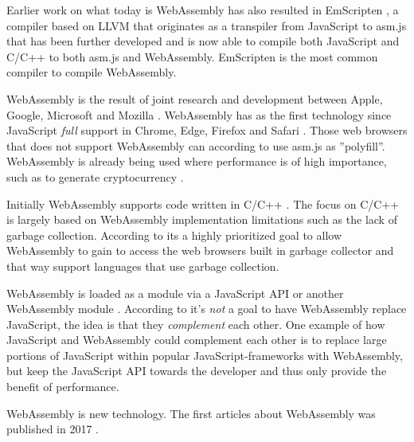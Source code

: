 Earlier work on what today is WebAssembly has also resulted in EmScripten \parencite{Zakai2011}, a compiler based on LLVM \parencite{LattnerAdve2014} that originates as a transpiler from JavaScript to asm.js \parencite{Zakai2011} that has been further developed \parencite{HaasRossbergSchuffTitzerHolmanGohmanWagnerZakaiBastien2017} and is now able to compile both JavaScript and C/C++ to both asm.js and WebAssembly. EmScripten is the most common compiler to compile WebAssembly.

WebAssembly is the result of joint research and development between Apple, Google, Microsoft and Mozilla \parencite{HaasRossbergSchuffTitzerHolmanGohmanWagnerZakaiBastien2017}. WebAssembly has as the first technology since JavaScript \emph{full} support in Chrome, Edge, Firefox and Safari \parencite{Moller2018}. Those web browsers that does not support WebAssembly can according to \textcite{HaasRossbergSchuffTitzerHolmanGohmanWagnerZakaiBastien2017} use asm.js as ''polyfill''. WebAssembly is already being used where performance is of high importance, such as to generate cryptocurrency \parencite{RuthZimmermannWolsingHohlfeld2018}.

Initially WebAssembly supports code written in C/C++ \parencite{HaasRossbergSchuffTitzerHolmanGohmanWagnerZakaiBastien2017}. 
The focus on C/C++ is largely based on WebAssembly implementation limitations such as the lack of garbage collection. According to \textcite{HaasRossbergSchuffTitzerHolmanGohmanWagnerZakaiBastien2017} its a highly prioritized goal to allow WebAssembly to gain to access the web browsers built in garbage collector and that way support languages that use garbage collection.

WebAssembly is loaded as a module via a JavaScript API or another WebAssembly module \parencite{HaasRossbergSchuffTitzerHolmanGohmanWagnerZakaiBastien2017}. According to \textcite{Moller2018} it's \emph{not} a goal to have WebAssembly replace JavaScript, the idea is that they \emph{complement} each other. One example of how JavaScript and WebAssembly could complement each other is to replace large portions of JavaScript within popular JavaScript-frameworks with WebAssembly, but keep the JavaScript API towards the developer and thus only provide the benefit of performance.

WebAssembly is new technology. The first articles about WebAssembly was published in 2017 \parencite{HaasRossbergSchuffTitzerHolmanGohmanWagnerZakaiBastien2017,ReiserBlaser2017}.
